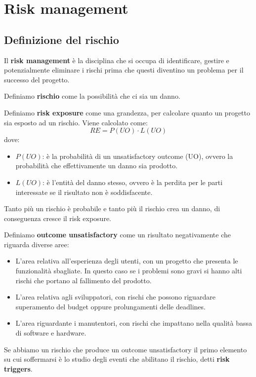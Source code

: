 \chapter{Risk management}
\section{Definizione del rischio}
\begin{definizione}
    Il \textbf{risk management} è la disciplina che si occupa di identificare,
    gestire e potenzialmente eliminare i rischi prima che questi diventino un
    problema per il successo del progetto.
\end{definizione}
\begin{definizione}
    Definiamo \textbf{rischio} come la possibilità che ci sia un danno.
\end{definizione}
\begin{definizione}
    Definiamo \textbf{risk exposure} come una grandezza, per calcolare quanto
    un progetto sia esposto ad un rischio. Viene calcolato come:
    \begin{equation}
        RE = P(UO) \cdot L(UO)
    \end{equation}
    dove:
    \begin{itemize}
        \item $P(UO)$: è la probabilità di un unsatisfactory outcome (UO), ovvero
              la probabilità che effettivamente un danno sia prodotto.
        \item $L(UO)$: è l'entità del danno stesso, ovvero è la perdita per le
              parti interessate se il risultato non è soddisfacente.
    \end{itemize}
    Tanto più un rischio è probabile e tanto più il rischio crea un danno, di
    conseguenza cresce il risk exposure.
\end{definizione}
\begin{definizione}
    Definiamo \textbf{outcome unsatisfactory} come un risultato negativamente che
    riguarda diverse aree:
    \begin{itemize}
        \item L'area relativa all'esperienza degli utenti, con un progetto che
              presenta le funzionalità sbagliate. In questo caso se i problemi sono
              gravi si hanno alti rischi che portano al fallimento del prodotto.
        \item L'area relativa agli sviluppatori, con rischi che possono riguardare
              superamento del budget oppure prolungamenti delle deadlines.
        \item L'area riguardante i manutentori, con rischi che impattano nella
              qualità bassa di software e hardware.
    \end{itemize}
\end{definizione}
Se abbiamo un rischio che produce un outcome unsatisfactory il primo elemento su
cui soffermarsi è lo studio degli eventi che abilitano il rischio, detti
\textbf{risk triggers}.

